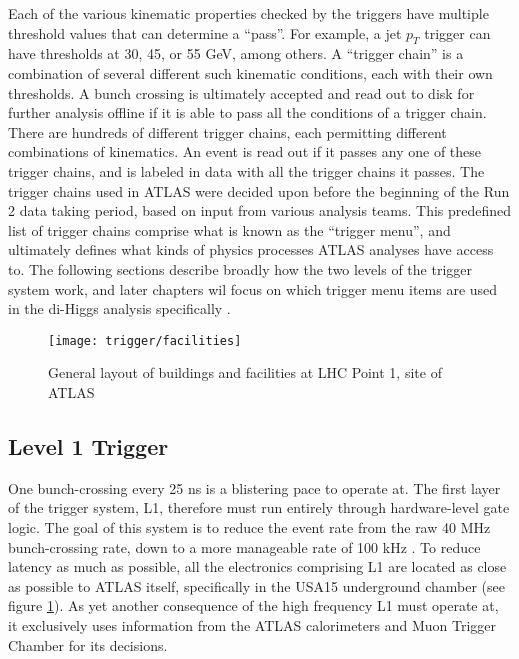     Each of the various kinematic properties checked by the triggers have multiple threshold values that can determine a ``pass''.
    For example, a jet $p_T$ trigger can have thresholds at 30, 45, or 55 GeV, among others.
    A ``trigger chain'' is a combination of several different such kinematic conditions, each with their own thresholds.
    A bunch crossing is ultimately accepted and read out to disk for further analysis offline if it is able to pass all the conditions of a trigger chain.
    There are hundreds of different trigger chains, each permitting different combinations of kinematics.
    An event is read out if it passes any one of these trigger chains, and is labeled in data with all the trigger chains it passes.
    The trigger chains used in ATLAS were decided upon before the beginning of the Run 2 data taking period, based on input from various analysis teams.
    This predefined list of trigger chains comprise what is known as the ``trigger menu'', and ultimately defines what kinds of physics processes ATLAS analyses have access to.
    The following sections describe broadly how the two levels of the trigger system work, and later chapters wil focus on which trigger menu items are used in the di-Higgs analysis specifically .

    \begin{figure}[h]
        \texttt{[image: trigger/facilities]}
        \caption{General layout of buildings and facilities at LHC Point 1, site of ATLAS \cite{trigger_tdr}}
        \label{fig:facilities}
    \end{figure}


    \subsection{Level 1 Trigger}

        One bunch-crossing every 25 ns is a blistering pace to operate at.
        The first layer of the trigger system, L1, therefore must run entirely through hardware-level gate logic.
        The goal of this system is to reduce the event rate from the raw 40 MHz bunch-crossing rate, down to a more manageable rate of 100 kHz \cite{trigger_run2}.
        To reduce latency as much as possible, all the electronics comprising L1 are located as close as possible to ATLAS itself, specifically in the USA15 underground chamber \cite{trigger_tdr} (see figure \ref{fig:facilities}).
        As yet another consequence of the high frequency L1 must operate at, it exclusively uses information from the ATLAS calorimeters and Muon Trigger Chamber for its decisions.

